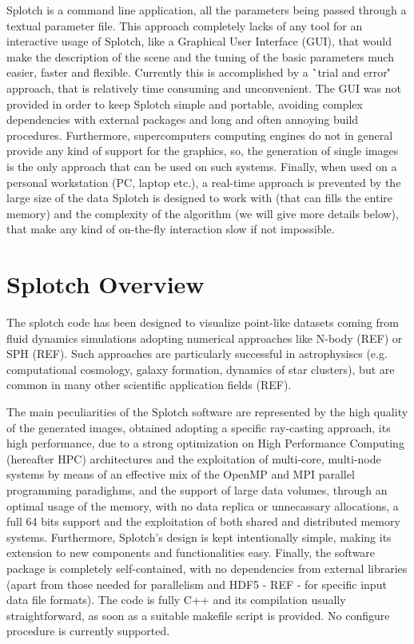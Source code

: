 \documentclass[11pt]{article}
\begin{document}
Splotch is a command line application, all the parameters being passed through 
a textual parameter file.
This approach completely lacks of any tool for an interactive usage of Splotch,
like a Graphical User Interface (GUI), that would make the description of the scene
and the tuning of the basic parameters much easier, faster and flexible. Currently 
this is accomplished by a \``trial and error\'' approach, that is relatively 
time consuming and unconvenient. The GUI was not provided in order to keep 
Splotch simple and portable, avoiding complex dependencies with external packages and
long and often annoying build procedures. Furthermore, supercomputers computing 
engines do not in general provide any kind of support for the graphics, so, the
generation of single images is the only approach that can be used on 
such systems. Finally, when used on a personal workstation (PC, laptop etc.),
a real-time approach is prevented by the large size of the data Splotch is
designed to work with (that can fills the entire memory) and the complexity 
of the algorithm (we will give more details below), that make any kind of 
on-the-fly interaction slow if not impossible.


\section{Splotch Overview}

The splotch code has been designed to visualize point-like datasets coming
from fluid dynamics simulations adopting numerical approaches like N-body (REF)
or SPH (REF). Such approaches are particularly successful in astrophysiscs (e.g. computational
cosmology, galaxy formation, dynamics of star clusters), but are common in 
many other scientific application fields (REF).

The main peculiarities of the Splotch software are represented by the 
high quality of the generated images, obtained adopting a specific ray-casting 
approach, its high performance, due to a strong optimization on High Performance Computing
(hereafter HPC) architectures and the exploitation of multi-core, multi-node 
systems by means of an effective mix of the OpenMP and MPI parallel programming paradighms, and
the support of large data volumes, through an optimal usage of the memory, with
no data replica or unnecassary allocations, a full 64 bits support and the exploitation
of both shared and distributed memory systems. Furthermore, Splotch's design is kept 
intentionally simple, making its extension to new components and functionalities easy. 
Finally, the software package is completely self-contained, with no dependencies from external 
libraries (apart from those needed for parallelism and HDF5 - REF - for
specific input data file formats). The code is fully C++ and its compilation
usually straightforward, as soon as a suitable makefile script is provided.
No configure procedure is currently supported.
\end{document}
